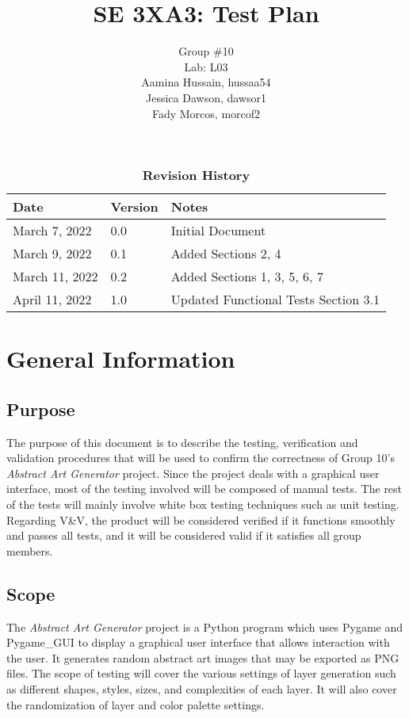\documentclass[12pt, titlepage]{article}
\title{SE 3XA3: Test Plan}
\author{Group \#10
        \\Lab: L03
		\\ Aamina Hussain, hussaa54
		\\ Jessica Dawson, dawsor1
		\\ Fady Morcos, morcof2
}
\date{}
\begin{document}
\maketitle

\tableofcontents
\listoftables
\listoffigures

\begin{table}[bp]
\caption{\bf Revision History}
\begin{tabularx}{\textwidth}{p{3cm}p{2cm}X}
\toprule {\bf Date} & {\bf Version} & {\bf Notes}\\
\midrule
March 7, 2022 & 0.0 & Initial Document\\
March 9, 2022 & 0.1 & Added Sections 2, 4\\
March 11, 2022 & 0.2 & Added Sections 1, 3, 5, 6, 7\\
\color{red}April 11, 2022 & \color{red}1.0 & \color{red}Updated Functional Tests Section 3.1\\
\bottomrule
\end{tabularx}
\end{table}

\newpage


\section{General Information}

\subsection{Purpose}

The purpose of this document is to describe the testing, verification and validation procedures that will be used to confirm the correctness of Group 10's \emph{Abstract Art Generator} project. Since the project deals with a graphical user interface, most of the testing involved will be composed of manual tests. The rest of the tests will mainly involve white box testing techniques such as unit testing. Regarding V\&V, the product will be considered verified if it functions smoothly and passes all tests, and it will be considered valid if it satisfies all group members.

\subsection{Scope}

The \emph{Abstract Art Generator} project is a Python program which uses Pygame and Pygame\_GUI to display a graphical user interface that allows interaction with the user. It generates random abstract art images that may be exported as PNG files. The scope of testing will cover the various settings of layer generation such as different shapes, styles, sizes, and complexities of each layer. It will also cover the randomization of layer and color palette settings.
\end{document}

